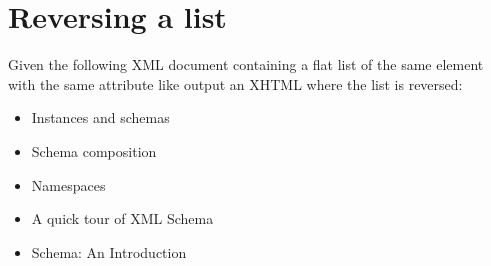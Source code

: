 \documentclass[11pt,a4paper]{article}
\author{Christian Rinderknecht}
\date{16 October 2007}
\newcommand\XML{\textsf{XML}\xspace}
\newcommand\XHTML{\textsf{XHTML}\xspace}
\begin{document}
\maketitle

\thispagestyle{empty}

\section{Reversing a list}

Given the following \XML document  containing a
flat list of the same element with the same attribute like
\noindent output an \XHTML where the list is reversed:
\begin{itemize}

  \item Instances and schemas

  \item Schema composition

  \item Namespaces

  \item A quick tour of XML Schema

  \item Schema: An Introduction

\end{itemize}
\end{document}

